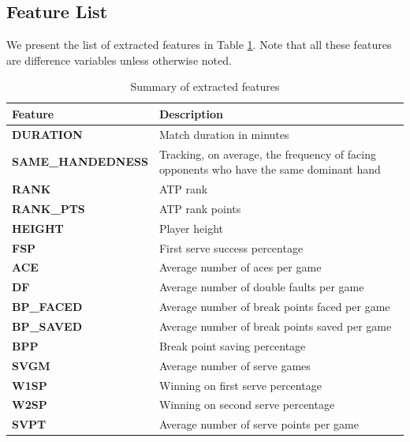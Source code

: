 \documentclass[paper=a4, fontsize=11pt]{scrartcl} %
\numberwithin{equation}{section} %
\numberwithin{figure}{section} %
\numberwithin{table}{section} %
\begin{document}
\subsection{Feature List}
We present the list of extracted features in Table \ref{tab:features}. Note that all these features are difference variables unless otherwise noted. 
\begin{center}
\begin{table}[h]
    \begin{tabular}{  l | p{10cm} }
    \hline
    Feature  & Description \\ \hline
    \textbf{DURATION}  & Match duration in minutes \\ \hline
    \textbf{SAME\_HANDEDNESS}  & Tracking, on average, the frequency of facing opponents who have the same dominant hand \\ \hline
    \textbf{RANK}  & ATP rank \\ \hline
    \textbf{RANK\_PTS}  & ATP rank points \\ \hline
    \textbf{HEIGHT}  & Player height \\ \hline
    \textbf{FSP}  & First serve success percentage \\ \hline
    \textbf{ACE}  & Average number of aces per game \\ \hline
    \textbf{DF}  & Average number of double faults per game \\ \hline
    \textbf{BP\_FACED}  & Average number of break points faced per game \\ \hline
    \textbf{BP\_SAVED}  & Average number of break points saved per game \\ \hline
    \textbf{BPP}  & Break point saving percentage \\ \hline
    \textbf{SVGM}  & Average number of serve games \\ \hline
    \textbf{W1SP}  & Winning on first serve percentage \\ \hline
    \textbf{W2SP}  & Winning on second serve percentage \\ \hline
    \textbf{SVPT}  & Average number of serve points per game \\ \hline
    \end{tabular}
    \caption{Summary of extracted features}
    \label{tab:features}
    \end{table}
\end{center}

\end{document}

